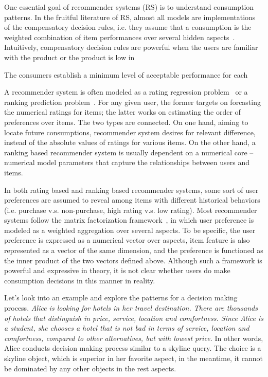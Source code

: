 \documentclass[sigconf]{acmart}
\begin{document}

One essential goal of recommender systems (RS) is to understand consumption patterns. In the fruitful literature of RS, almost all models are implementations of the compensatory decision rules, i.e. they assume that a consumption is the weighted combination of item performances over several hidden aspects~\cite{Hu2008Collaborative,Gopalan2015Scalable}. Intuitively, compensatory decision rules are powerful when the users are familiar with the product or the product is low in     


The consumers establish a minimum level of acceptable performance for each 








  
A recommender system is often modeled as a rating regression problem~\cite{Bobadilla2013Recommender} or a ranking prediction problem~\cite{Rendle2009BPR}. For any given user, the former targets on forcasting the numerical ratings for items; the latter works on estimating the order of preferences over items. The two types are connected. On one hand, aiming to locate future consumptions, recommender system desires for relevant difference, instead of the absolute values of ratings for various items. On the other hand, a ranking based recommender system is usually dependent on a numerical core -- numerical model parameters that capture the relationships between users and items.         

In both rating based and ranking based recommender systems, some sort of user preferences are assumed to reveal among items with different historical behaviors (i.e. purchase v.s. non-purchase, high rating v.s. low rating). Most recommender systems follow the matrix factorization framework~\cite{Koren2009Matrix}, in which user preference is modeled as a weighted aggregation over several aspects. To be specific, the user preference is expressed as a numerical vector over aspects, item feature is also represented as a vector of the same dimension, and the preference is functioned as the inner product of the two vectors defined above. Although such a framework is powerful and expressive in theory, it is not clear whether users do make consumption decisions in this manner in reality.  

Let's look into an example and explore the patterns for a decision making process. \textit{Alice is looking for hotels in her travel destination. There are thousands of hotels that distinguish in price, service, location and comfortness. Since Alice is a student, she chooses a hotel that is not bad in terms of service, location and comfortness, compared to other alternatives, but with lowest price.} In other words, Alice conducts decision making process similar to a skyline query. The choice is a skyline object, which is superior in her favorite aspect, in the meantime, it cannot be dominated by any other objects in the rest aspects. 
\end{document}
